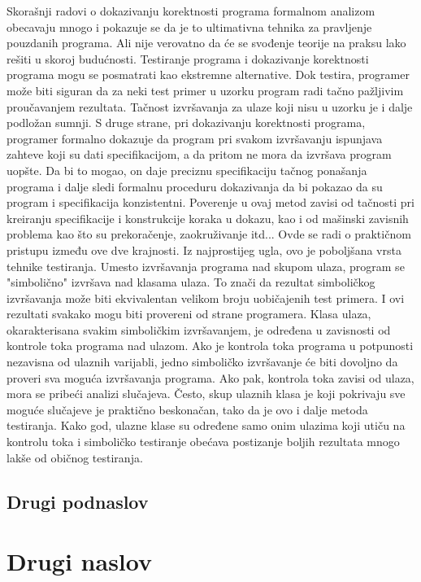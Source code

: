 \documentclass[a4paper]{article}
\begin{document}
{Skorašnji radovi o dokazivanju korektnosti programa formalnom analizom obecavaju mnogo i pokazuje se da je to ultimativna tehnika za pravljenje pouzdanih programa. Ali nije verovatno da će se svođenje teorije na praksu lako rešiti u skoroj budućnosti. Testiranje programa i dokazivanje korektnosti programa mogu se posmatrati kao ekstremne alternative. Dok testira, programer može biti siguran da za neki test primer u uzorku program radi tačno pažljivim proučavanjem rezultata. Tačnost izvršavanja za ulaze koji nisu u uzorku je i dalje podložan sumnji. S druge strane, pri dokazivanju korektnosti programa, programer formalno dokazuje da program pri svakom izvršavanju ispunjava zahteve koji su dati specifikacijom, a da pritom ne mora da izvršava program uopšte. Da bi to mogao, on daje preciznu specifikaciju tačnog ponašanja programa i dalje sledi formalnu proceduru dokazivanja da bi pokazao da su program i specifikacija konzistentni. Poverenje u ovaj metod zavisi od tačnosti pri kreiranju specifikacije i konstrukcije koraka u dokazu, kao i od mašinski zavisnih problema kao što su prekoračenje, zaokruživanje itd...  Ovde se radi o praktičnom pristupu između ove dve krajnosti. Iz najprostijeg ugla, ovo je poboljšana vrsta tehnike testiranja. Umesto izvršavanja programa nad skupom ulaza, program se "simbolično" izvršava nad klasama ulaza. To znači da rezultat simboličkog izvršavanja može biti ekvivalentan velikom broju uobičajenih test primera. I ovi rezultati svakako mogu biti provereni od strane programera. Klasa ulaza, okarakterisana svakim simboličkim izvršavanjem, je određena u zavisnosti od kontrole toka programa nad ulazom. Ako je kontrola toka programa u potpunosti nezavisna od ulaznih varijabli, jedno simboličko izvršavanje će biti dovoljno da proveri sva moguća izvršavanja programa. Ako pak, kontrola toka zavisi od ulaza, mora se pribeći analizi slučajeva. Često, skup ulaznih klasa je koji pokrivaju sve moguće slučajeve je praktično beskonačan, tako da je ovo i dalje metoda testiranja. Kako god, ulazne klase su određene samo onim ulazima koji utiču na kontrolu toka i simboličko testiranje obećava postizanje boljih rezultata mnogo lakše od običnog testiranja.  


\subsection{Drugi podnaslov}
\label{subsec:podnaslov2}



\section{Drugi naslov}
\label{sec:naslov2}


}
\end{document}
